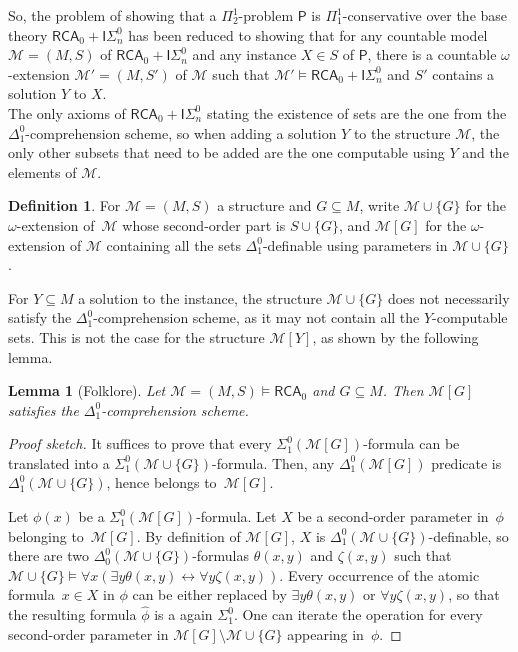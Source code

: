 \documentclass{article}
\def\M{\mathcal{M}}
\def\Psf{\mathsf{P}}
\newcommand{\ISig}{\mathsf{I}\Sigma^0}
\newcommand{\RCA}{\mathsf{RCA}}
\numberwithin{theorem}{section}
\newtheorem{lemma}[theorem]{Lemma}
\theoremstyle{definition}
\newtheorem{definition}[theorem]{Definition}
\begin{document}
So, the problem of showing that a $\Pi_2^1$-problem $\Psf$ is $\Pi_1^1$-conservative over the base theory $\RCA_0 + \ISig_n$ has been reduced to showing that for any countable model $\M = (M,S)$ of $\RCA_0 + \ISig_n$ and any instance $X \in S$ of $\Psf$, there is a countable $\omega$-extension $\M' = (M,S')$ of $\M$ such that $\M' \models \RCA_0 + \ISig_n$ and $S'$ contains a solution $Y$ to $X$. \\


The only axioms of $\RCA_0 + \ISig_n$ stating the existence of sets are the one from the $\Delta^0_1$-comprehension scheme, so when adding a solution $Y$ to the structure $\M$, the only other subsets that need to be added are the one computable using $Y$ and the elements of $\M$.

\begin{definition}
    For $\M = (M,S)$ a structure and $G \subseteq M$, write $\M \cup \{G\}$ for the $\omega$-extension of~$\M$ whose second-order part is $S \cup \{G\}$, and $\M[G]$ for the $\omega$-extension of $\M$ containing all the sets $\Delta_1^0$-definable using parameters in $\M \cup \{G\}$.
\end{definition}

For $Y \subseteq M$ a solution to the instance, the structure $\M \cup \{G\}$ does not necessarily satisfy the $\Delta^0_1$-comprehension scheme, as it may not contain all the $Y$-computable sets. This is not the case for the structure $\M[Y]$, as shown by the following lemma. 

\begin{lemma}[Folklore]\label{lem:formula-translation}
    Let $\M = (M,S) \models \RCA_0$ and $G \subseteq M$. Then $\M[G]$ satisfies the $\Delta^0_1$-comprehension scheme.
\end{lemma}
\begin{proof}[Proof sketch]
It suffices to prove that every $\Sigma^0_1(\M[G])$-formula can be translated into a $\Sigma^0_1(\M \cup \{G\})$-formula. Then, any $\Delta^0_1(\M[G])$ predicate is $\Delta^0_1(\M \cup \{G\})$, hence belongs to~$\M[G]$.

Let $\phi(x)$ be a $\Sigma^0_1(\M[G])$-formula. Let $X$ be a second-order parameter in~$\phi$ belonging to~$\M[G]$. By definition of $\M[G]$, $X$ is $\Delta^0_1(\M \cup \{G\})$-definable, so there are two $\Delta^0_0(\M \cup \{G\})$-formulas $\theta(x, y)$ and $\zeta(x, y)$ such that $\M \cup \{G\} \models \forall x(\exists y\theta(x,y) \leftrightarrow \forall y\zeta(x, y))$. Every occurrence of the atomic formula~$x \in X$ in $\phi$ can be either replaced by $\exists y \theta(x, y)$ or $\forall y \zeta(x, y)$, so that the resulting formula $\hat\phi$ is a again $\Sigma^0_1$. One can iterate the operation for every second-order parameter in $\M[G] \setminus \M \cup \{G\}$ appearing in~$\phi$.
\end{proof}
\end{document}
